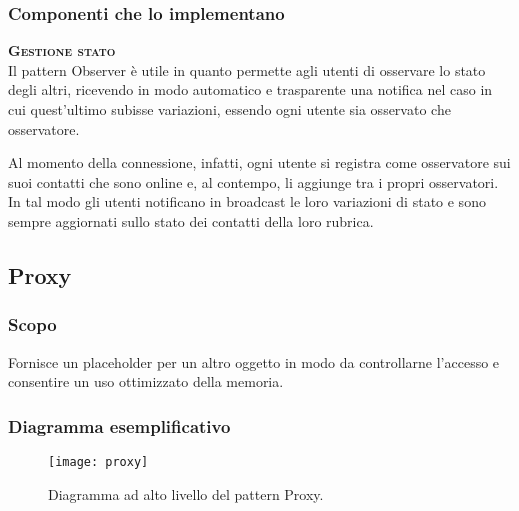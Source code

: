 \subsubsection{Componenti che lo implementano}
\begin{description}
  \item{\scshape\bfseries Gestione stato}\\
Il pattern Observer è utile in quanto permette agli utenti di osservare lo stato degli altri, ricevendo in modo automatico e trasparente una notifica nel caso in cui quest'ultimo subisse variazioni, essendo ogni utente sia osservato che osservatore.

Al momento della connessione, infatti, ogni utente si registra come osservatore sui suoi contatti che sono online e, al contempo, li aggiunge tra i propri osservatori. In tal modo gli utenti notificano in broadcast le loro variazioni di stato e sono sempre aggiornati sullo stato dei contatti della loro rubrica.
\end{description}

\subsection{Proxy}

\subsubsection{Scopo}
Fornisce un placeholder per un altro oggetto in modo da controllarne l'accesso e consentire un uso ottimizzato della memoria.

\subsubsection{Diagramma esemplificativo}
\begin{figure}[H]
\centering
\texttt{[image: proxy]}
\caption{Diagramma ad alto livello del pattern Proxy.}\label{fig:proxy}
\end{figure}

